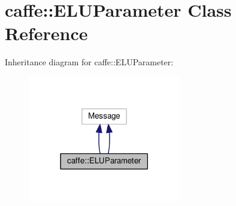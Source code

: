 \hypertarget{classcaffe_1_1_e_l_u_parameter}{}\section{caffe\+:\+:E\+L\+U\+Parameter Class Reference}
\label{classcaffe_1_1_e_l_u_parameter}


Inheritance diagram for caffe\+:\+:E\+L\+U\+Parameter\+:
\nopagebreak
\begin{figure}[H]
\begin{center}
\leavevmode
\includegraphics[width=189pt]{classcaffe_1_1_e_l_u_parameter__inherit__graph}
\end{center}
\end{figure}

